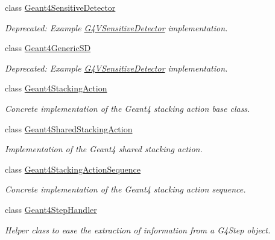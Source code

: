 \begin{DoxyCompactItemize}
class \hyperlink{class_d_d4hep_1_1_simulation_1_1_geant4_sensitive_detector}{Geant4SensitiveDetector}
\begin{DoxyCompactList}\small\item\em Deprecated: Example \hyperlink{class_g4_v_sensitive_detector}{G4VSensitiveDetector} implementation. \item\end{DoxyCompactList}\item 
class \hyperlink{class_d_d4hep_1_1_simulation_1_1_geant4_generic_s_d}{Geant4GenericSD}
\begin{DoxyCompactList}\small\item\em Deprecated: Example \hyperlink{class_g4_v_sensitive_detector}{G4VSensitiveDetector} implementation. \item\end{DoxyCompactList}\item 
class \hyperlink{class_d_d4hep_1_1_simulation_1_1_geant4_stacking_action}{Geant4StackingAction}
\begin{DoxyCompactList}\small\item\em Concrete implementation of the Geant4 stacking action base class. \item\end{DoxyCompactList}\item 
class \hyperlink{class_d_d4hep_1_1_simulation_1_1_geant4_shared_stacking_action}{Geant4SharedStackingAction}
\begin{DoxyCompactList}\small\item\em Implementation of the Geant4 shared stacking action. \item\end{DoxyCompactList}\item 
class \hyperlink{class_d_d4hep_1_1_simulation_1_1_geant4_stacking_action_sequence}{Geant4StackingActionSequence}
\begin{DoxyCompactList}\small\item\em Concrete implementation of the Geant4 stacking action sequence. \item\end{DoxyCompactList}\item 
class \hyperlink{class_d_d4hep_1_1_simulation_1_1_geant4_step_handler}{Geant4StepHandler}
\begin{DoxyCompactList}\small\item\em Helper class to ease the extraction of information from a G4Step object. \item\end{DoxyCompactList}\item 

\end{DoxyCompactItemize}
